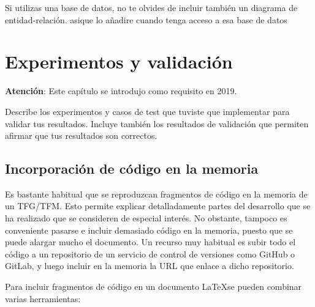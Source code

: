 \documentclass[a4paper, 12pt]{book}
\begin{document}
Si utilizas una base de datos, no te olvides de incluir también un diagrama de entidad-relación.
asique lo añadire cuando tenga acceso a esa base de datos

\cleardoublepage


\chapter{Experimentos y validación}
\label{chap:experimentos}

\textbf{Atención}: Este capítulo se introdujo como requisito en 2019.

Describe los experimentos y casos de test que tuviste que implementar para validar tus resultados. 
Incluye también los resultados de validación que permiten afirmar que tus resultados son correctos.

\section{Incorporación de código en la memoria}

Es bastante habitual que se reproduzcan fragmentos de código en la memoria de un TFG/TFM.
Esto permite explicar detalladamente partes del desarrollo que se ha realizado que se consideren
de especial interés. No obstante, tampoco es conveniente pasarse e incluir demasiado código en
la memoria, puesto que se puede alargar mucho el documento. Un recurso muy habitual es subir
todo el código a un repositorio de un servicio de control de versiones como GitHub o GitLab,
y luego incluir en la memoria la URL que enlace a dicho repositorio.

Para incluir fragmentos de código en un documento \LaTeX se pueden combinar varias
herramientas:

\end{document}
